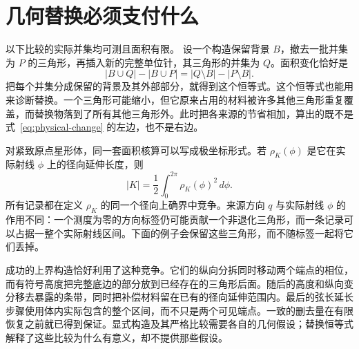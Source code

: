 \section{几何替换必须支付什么}\label{sec:replacement-bank}
以下比较的实际并集均可测且面积有限。
设一个构造保留背景 $B$，撤去一批并集为 $P$ 的三角形，再插入新的完整单位针，其三角形的并集为 $Q$。面积变化恰好是
\begin{equation}\label{eq:physical-change}
 |B\cup Q|-|B\cup P|=|Q\setminus B|-|P\setminus B|.
\end{equation}
把每个并集分成保留的背景及其外部部分，就得到这个恒等式。这个恒等式也能用来诊断替换。一个三角形可能缩小，但它原来占用的材料被许多其他三角形重复覆盖，而替换物落到了所有其他三角形外。此时把各来源的节省相加，算出的既不是式~\eqref{eq:physical-change} 的左边，也不是右边。

对紧致原点星形体，同一套面积核算可以写成极坐标形式。若 $\rho_K(\phi)$ 是它在实际射线 $\phi$ 上的径向延伸长度，则
\[
 |K|=\frac12\int_0^{2\pi}\rho_K(\phi)^2\,d\phi.
\]
所有记录都在定义 $\rho_K$ 的同一个径向上确界中竞争。来源方向 $q$ 与实际射线 $\phi$ 的作用不同：一个测度为零的方向标签仍可能贡献一个非退化三角形，而一条记录可以占据一整个实际射线区间。下面的例子会保留这些三角形，而不随标签一起将它们丢掉。

成功的上界构造恰好利用了这种竞争。它们的纵向分拆同时移动两个端点的相位，而有符号高度把完整底边的部分放到已经存在的三角形后面。随后的高度和纵向变分移去暴露的条带，同时把补偿材料留在已有的径向延伸范围内。最后的弦长延长步骤使用体内实际包含的整个区间，而不只是两个可见端点。一致的删去量在有限恢复之前就已得到保证。显式构造及其严格比较需要各自的几何假设；替换恒等式解释了这些比较为什么有意义，却不提供那些假设。

